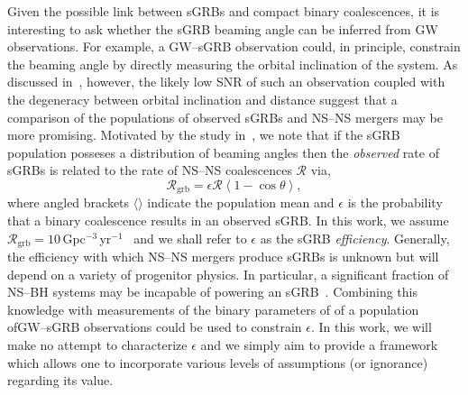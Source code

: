 \documentclass[twocolumn,nofootinbib]{revtex4-1}
\newcommand{\grbrate}{{{\mathcal R}_{\mathrm{grb}}}}
\newcommand{\cbcrate}{{{\mathcal R}}}
\newcommand{\BNS}{\ac{NS}--\ac{NS}\xspace}
\newcommand{\NSBH}{\ac{NS}--\ac{BH}\xspace}
\newcommand{\JOINT}{\ac{GW}--\ac{sGRB}\xspace}
\begin{document}
Given the possible link between \acp{sGRB} and compact binary
coalescences, it is interesting to ask whether the \ac{sGRB} beaming
angle can be inferred from \ac{GW} observations.  For example, a
\JOINT observation could, in principle, constrain the beaming angle by
directly measuring the orbital inclination of the system.  As
discussed in~\cite{Clark:2014jpa}, however, the likely low \ac{SNR} of
such an observation coupled with the degeneracy between orbital
inclination and distance suggest that a comparison of the populations
of observed \acp{sGRB} and \BNS mergers may be more promising.
Motivated by the study in~\cite{2013PhRvL.111r1101C}, we note that if
the \ac{sGRB} population posseses a distribution of beaming angles
then the \emph{observed} rate of \acp{sGRB} is related to the rate of
\BNS coalescences $\cbcrate$ via,
%
\begin{equation}\label{eq:rate2angle}
    \grbrate = \epsilon\cbcrate \left \langle 1-\cos \theta \right \rangle,
\end{equation}
%
where angled brackets $\langle \rangle$ indicate the population mean
and $\epsilon$ is the probability that a binary coalescence results in
an observed \ac{sGRB}.  In this work, we assume
$\grbrate=10$\,Gpc$^{-3}$\,yr$^{-1}$~\cite{Nakar:2007yr,Dietz:2010eh}
and we shall refer to $\epsilon$ as the \ac{sGRB} \emph{efficiency}.
Generally, the efficiency with which \BNS mergers produce \acp{sGRB}
is unknown but will depend on a variety of progenitor physics.  In
particular, a significant fraction of \NSBH systems may be incapable
of powering an \ac{sGRB}~\cite{Pannarale:2014rea}.  Combining this
knowledge with measurements of the binary parameters of of a
population of\JOINT observations could be used to constrain
$\epsilon$.  In this work, we will make no attempt to characterize
$\epsilon$ and we simply aim to provide a framework which allows one
to incorporate various levels of assumptions (or ignorance) regarding
its value.
\end{document}
